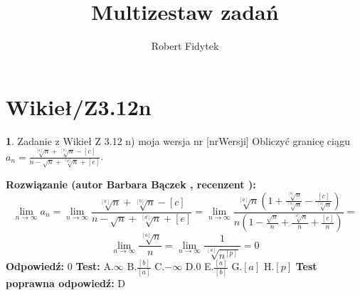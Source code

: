 \documentclass[12pt, a4paper]{article}
\title{Multizestaw zadań}
\author{Robert Fidytek}
\date{}
\theoremstyle{definition} %
\newtheorem{zad}{}
\newcommand{\kategoria}[1]{\section{#1}} %
\newcommand{\zadStart}[1]{\begin{zad}#1\newline} %
\newcommand{\zadStop}{\end{zad}}   %
\newcommand{\rozwStart}[2]{\noindent \textbf{Rozwiązanie (autor #1 , recenzent #2): }\newline} %
\newcommand{\rozwStop}{\newline}                                            %
\newcommand{\odpStart}{\noindent \textbf{Odpowiedź:}\newline}    %
\newcommand{\odpStop}{\newline}                                             %
\newcommand{\testStart}{\noindent \textbf{Test:}\newline} %
\newcommand{\testStop}{\newline} %
\newcommand{\kluczStart}{\noindent \textbf{Test poprawna odpowiedź:}\newline} %
\newcommand{\kluczStop}{\newline} %
\begin{document}
\maketitle


\kategoria{Wikieł/Z3.12n}
\zadStart{Zadanie z Wikieł Z 3.12 n) moja wersja nr [nrWersji]}
Obliczyć granicę ciągu $a_n= \frac{\sqrt[{[a]}]{n}+\sqrt[{[b]}]{n}-[c]}{n -\sqrt{n} + \sqrt[{[d]}]{n}+ [e]}$.
\zadStop
\rozwStart{Barbara Bączek}{}
$$\lim_{n \rightarrow \infty} a_n= \lim_{n \rightarrow \infty} \frac{\sqrt[{[a]}]{n}+\sqrt[{[b]}]{n}-[c]}{n -\sqrt{n} + \sqrt[{[d]}]{n}+ [e]}= \lim_{n \rightarrow \infty} \frac{\sqrt[{[a]}]{n}(1+\frac{\sqrt[{[b]}]{n}}{\sqrt[{[a]}]{n}}-\frac{[c]}{\sqrt[{[a]}]{n}})}{n(1 -\frac{\sqrt{n}}{n} + \frac{\sqrt[{[d]}]{n}}{n}+ \frac{[e]}{n})}=$$
$$ \lim_{n \rightarrow \infty} \frac{\sqrt[{[a]}]{n}}{n}=  \lim_{n \rightarrow \infty} \frac{1}{\sqrt[{[a]}]{n^{[p]}}}= 0$$ 
\rozwStop
\odpStart
$0$
\odpStop
\testStart
A.$\infty$
B.$\frac{[b]}{[a]}$
C.$-\infty$
D.$0$
E.$\frac{[a]}{[b]}$
G.$[a]$
H.$[p]$
\testStop
\kluczStart
D
\kluczStop
\end{document}
